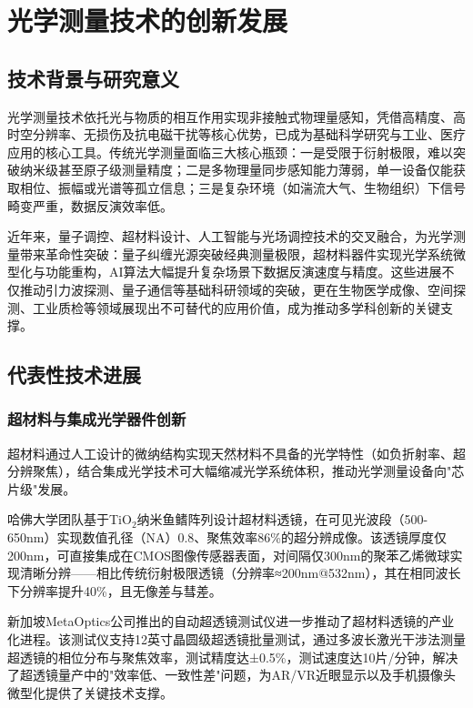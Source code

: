 \documentclass[lettersize,journal]{IEEEtran}
\begin{document}
	
	\section{光学测量技术的创新发展}
	\label{sec:optical}
	
	\subsection{技术背景与研究意义}
	光学测量技术依托光与物质的相互作用实现非接触式物理量感知，凭借高精度、高时空分辨率、无损伤及抗电磁干扰等核心优势，已成为基础科学研究与工业、医疗应用的核心工具。传统光学测量面临三大核心瓶颈：一是受限于衍射极限，难以突破纳米级甚至原子级测量精度；二是多物理量同步感知能力薄弱，单一设备仅能获取相位、振幅或光谱等孤立信息；三是复杂环境（如湍流大气、生物组织）下信号畸变严重，数据反演效率低。
	
	近年来，量子调控、超材料设计、人工智能与光场调控技术的交叉融合，为光学测量带来革命性突破：量子纠缠光源突破经典测量极限，超材料器件实现光学系统微型化与功能重构，AI算法大幅提升复杂场景下数据反演速度与精度。这些进展不仅推动引力波探测、量子通信等基础科研领域的突破，更在生物医学成像、空间探测、工业质检等领域展现出不可替代的应用价值，成为推动多学科创新的关键支撑。
	
	\subsection{代表性技术进展}
	
	\subsubsection{超材料与集成光学器件创新}
	超材料通过人工设计的微纳结构实现天然材料不具备的光学特性（如负折射率、超分辨聚焦），结合集成光学技术可大幅缩减光学系统体积，推动光学测量设备向"芯片级"发展。
	
	哈佛大学团队基于TiO$_2$纳米鱼鳍阵列设计超材料透镜，在可见光波段（500-650nm）实现数值孔径（NA）0.8、聚焦效率86\%的超分辨成像\cite{harvard2024metasurface}。该透镜厚度仅200nm，可直接集成在CMOS图像传感器表面，对间隔仅300nm的聚苯乙烯微球实现清晰分辨——相比传统衍射极限透镜（分辨率≈200nm@532nm），其在相同波长下分辨率提升40\%，且无像差与彗差。
	
	新加坡MetaOptics公司推出的自动超透镜测试仪进一步推动了超材料透镜的产业化进程\cite{metaoptics2024tester}。该测试仪支持12英寸晶圆级超透镜批量测试，通过多波长激光干涉法测量超透镜的相位分布与聚焦效率，测试精度达±0.5\%，测试速度达10片/分钟，解决了超透镜量产中的"效率低、一致性差"问题，为AR/VR近眼显示以及手机摄像头微型化提供了关键技术支撑。
	
\end{document}
